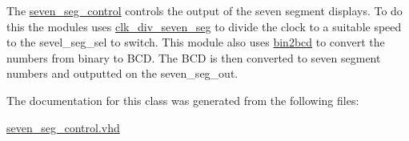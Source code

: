 The \hyperlink{classseven__seg__control}{seven\-\_\-seg\-\_\-control} controls the output of the seven segment displays. To do this the modules uses \hyperlink{classclk__div__seven__seg}{clk\-\_\-div\-\_\-seven\-\_\-seg} to divide the clock to a suitable speed to the sevel\-\_\-seg\-\_\-sel to switch. This module also uses \hyperlink{classbin2bcd}{bin2bcd} to convert the numbers from binary to B\-C\-D. The B\-C\-D is then converted to seven segment numbers and outputted on the seven\-\_\-seg\-\_\-out. 

The documentation for this class was generated from the following files\-:\begin{DoxyCompactItemize}
\item 
\hyperlink{seven__seg__control_8vhd}{seven\-\_\-seg\-\_\-control.\-vhd}\end{DoxyCompactItemize}
